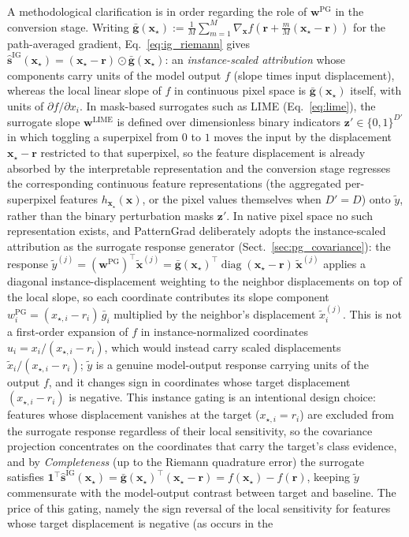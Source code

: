 \documentclass[pdflatex,sn-mathphys-num]{sn-jnl}
\theoremstyle{thmstyleone}
\theoremstyle{thmstyletwo}%
\theoremstyle{thmstylethree}%
\begin{document}
A methodological clarification is in order regarding the role of $\mathbf{w}^{\text{PG}}$ in the conversion stage. Writing $\bar{\mathbf{g}}(\mathbf{x}_\star) \mathrel{:=} \frac{1}{M}\sum_{m=1}^{M} \nabla_{\mathbf{x}} f\!\left(\mathbf{r} + \frac{m}{M}(\mathbf{x}_\star - \mathbf{r})\right)$ for the path-averaged gradient, Eq.~\eqref{eq:ig_riemann} gives $\hat{\mathbf{s}}^{\text{IG}}(\mathbf{x}_\star) = (\mathbf{x}_\star - \mathbf{r}) \odot \bar{\mathbf{g}}(\mathbf{x}_\star)$: an \emph{instance-scaled attribution} whose components carry units of the model output $f$ (slope times input displacement), whereas the local linear slope of $f$ in continuous pixel space is $\bar{\mathbf{g}}(\mathbf{x}_\star)$ itself, with units of $\partial f / \partial x_i$. In mask-based surrogates such as LIME (Eq.~\eqref{eq:lime}), the surrogate slope $\mathbf{w}^{\text{LIME}}$ is defined over dimensionless binary indicators $\mathbf{z}' \in \{0, 1\}^{D'}$ in which toggling a superpixel from $0$ to $1$ moves the input by the displacement $\mathbf{x}_\star - \mathbf{r}$ restricted to that superpixel, so the feature displacement is already absorbed by the interpretable representation and the conversion stage regresses the corresponding continuous feature representations (the aggregated per-superpixel features $h_{\mathbf{x}_\star}(\mathbf{x})$, or the pixel values themselves when $D' = D$) onto $\tilde{y}$, rather than the binary perturbation masks $\mathbf{z}'$. In native pixel space no such representation exists, and PatternGrad deliberately adopts the instance-scaled attribution as the surrogate response generator (Sect.~\ref{sec:pg_covariance}): the response $\tilde{y}^{(j)} = (\mathbf{w}^{\text{PG}})^\top \tilde{\mathbf{x}}^{(j)} = \bar{\mathbf{g}}(\mathbf{x}_\star)^\top \operatorname{diag}(\mathbf{x}_\star - \mathbf{r})\, \tilde{\mathbf{x}}^{(j)}$ applies a diagonal instance-displacement weighting to the neighbor displacements on top of the local slope, so each coordinate contributes its slope component $w^{\text{PG}}_i = (x_{\star,i} - r_i)\,\bar{g}_i$ multiplied by the neighbor's displacement $\tilde{x}^{(j)}_i$. This is not a first-order expansion of $f$ in instance-normalized coordinates $u_i = x_i / (x_{\star,i} - r_i)$, which would instead carry scaled displacements $\tilde{x}_{i} / (x_{\star,i} - r_i)$; $\tilde{y}$ is a genuine model-output response carrying units of the output $f$, and it changes sign in coordinates whose target displacement $(x_{\star,i} - r_i)$ is negative. This instance gating is an intentional design choice: features whose displacement vanishes at the target ($x_{\star,i} = r_i$) are excluded from the surrogate response regardless of their local sensitivity, so the covariance projection concentrates on the coordinates that carry the target's class evidence, and by \emph{Completeness} (up to the Riemann quadrature error) the surrogate satisfies $\mathbf{1}^\top \hat{\mathbf{s}}^{\text{IG}}(\mathbf{x}_\star) = \bar{\mathbf{g}}(\mathbf{x}_\star)^\top (\mathbf{x}_\star - \mathbf{r}) = f(\mathbf{x}_\star) - f(\mathbf{r})$, keeping $\tilde{y}$ commensurate with the model-output contrast between target and baseline. The price of this gating, namely the sign reversal of the local sensitivity for features whose target displacement is negative (as occurs in the 
\end{document}
